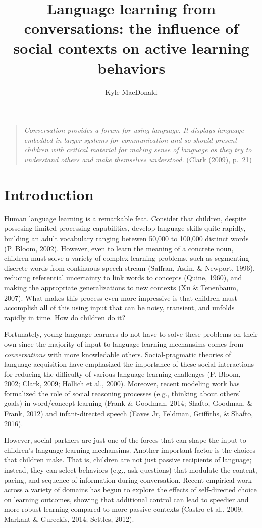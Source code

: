 \documentclass[a4paper,man,apacite,floatsintext]{apa6}
\date{}
\title{\textbf{Language learning from conversations: the influence of social contexts
on active learning behaviors}}
\author{Kyle MacDonald}
\affiliation{Department of Psychology, Stanford University}
\begin{document}
\maketitle

\begin{quote}
\emph{Conversation provides a forum for using language. It displays
language embedded in larger systems for communication and so should
present children with critical material for making sense of language as
they try to understand others and make themselves understood.} (Clark
(2009), p.~21)
\end{quote}

\section{Introduction}\label{introduction}

Human language learning is a remarkable feat. Consider that children,
despite possesing limited processing capabilities, develop language
skills quite rapidly, building an adult vocabulary ranging betewen
50,000 to 100,000 distinct words (P. Bloom, 2002). However, even to
learn the meaning of a concrete noun, children must solve a variety of
complex learning problems, such as segmenting discrete words from
continuous speech stream (Saffran, Aslin, \& Newport, 1996), reducing
referential uncertainty to link words to concepts (Quine, 1960), and
making the appropriate generalizations to new contexts (Xu \& Tenenbaum,
2007). What makes this process even more impressive is that children
must accomplish all of this using input that can be noisy, transient,
and unfolds rapidly in time. How do children do it?

Fortunately, young language learners do not have to solve these problems
on their own since the majority of input to language learning mechansims
comes from \emph{conversations} with more knowledable others.
Social-pragmatic theories of language acquisition have emphasized the
importance of these social interactions for reducing the difficulty of
various language learning challenges (P. Bloom, 2002; Clark, 2009;
Hollich et al., 2000). Moreover, recent modeling work has formalized the
role of social reasoning processes (e.g., thinking about others' goals)
in word/concept learning (Frank \& Goodman, 2014; Shafto, Goodman, \&
Frank, 2012) and infant-directed speech (Eaves Jr, Feldman, Griffiths,
\& Shafto, 2016).

However, social partners are just one of the forces that can shape the
input to children's language learning mechansims. Another important
factor is the choices that children make. That is, children are not just
passive recipients of language; instead, they can select behaviors
(e.g., ask questions) that modulate the content, pacing, and sequence of
information during conversation. Recent empirical work across a variety
of domains has begun to explore the effects of self-directed choice on
learning outcomes, showing that additional control can lead to speedier
and more robust learning compared to more passive contexts (Castro et
al., 2009; Markant \& Gureckis, 2014; Settles, 2012).
\end{document}
